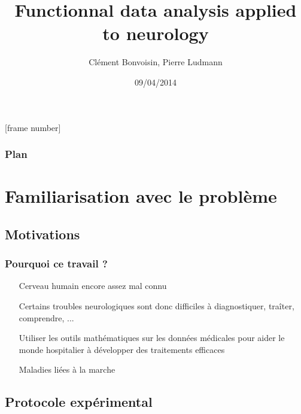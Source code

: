 \documentclass{beamer}
\title[Signal segmentation]{Functionnal data analysis applied to neurology}
\author{Clément Bonvoisin, Pierre Ludmann}
\institute{CMLA (ENS Cachan), Cognac-G (Paris V)}
\date{09/04/2014}
\begin{document}
[frame number]

\begin{frame}
\titlepage
\end{frame}

\begin{frame}
\frametitle{Plan}
  \tableofcontents[hideallsubsections]
\end{frame}


\section{Familiarisation avec le problème}
\subsection{Motivations}
\begin{frame}
	\frametitle{Pourquoi ce travail ?}
	\begin{itemize}
		\item[Cerveau] humain encore assez mal connu
		\item[Certains] troubles neurologiques sont donc difficiles à diagnostiquer, traîter, comprendre, ...
		\item[Utiliser] les outils mathématiques sur les données médicales pour aider le monde hospitalier à développer des traitements efficaces
		\item[Maladies] liées à la marche
	\end{itemize}	
\end{frame}

\subsection{Protocole expérimental}
\end{document}
